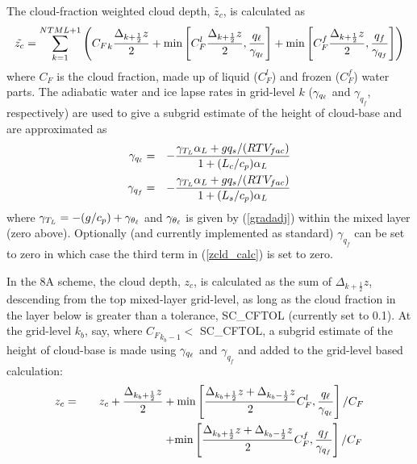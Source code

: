 \documentclass{UMDP_article}
\begin{document}
The cloud-fraction weighted cloud depth, $\tilde{z_c}$, is calculated
as
\begin{equation}
  \tilde{z_c} = \sum_{k=1}^{NTML+1} \left( {C_F}_k \frac{\Delta_{k+\frac{1}{2}} z}{2} 
    + \mbox{min}\left[C_F^l\frac{\Delta_{k+\frac{1}{2}} z}{2}, \frac{q_{\ell}}{\gamma_{q_{\ell}}} \right]
    + \mbox{min}\left[C_F^f\frac{\Delta_{k+\frac{1}{2}} z}{2}, \frac{q_f}{\gamma_{q_f}} \right]
  \right)
\label{zcld_calc}
\end{equation}
where $C_F$ is the cloud fraction, made up of liquid ($C_F^l$) and
frozen ($C_F^f$) water parts.  The adiabatic water and ice lapse rates
in grid-level $k$ ($\gamma_{q_{\ell}}$ and $\gamma_{q_f}$, respectively)
are used to give a subgrid estimate of the height of cloud-base and
are approximated as
\begin{eqnarray*}
  \gamma_{q_{\ell}} &=& -\frac{\gamma_{T_L} \alpha_L + g q_s/(RTV_{fac})}
  {1+(L_c/c_p)\alpha_L} \\
  \gamma_{q_f} &=& -\frac{\gamma_{T_L}\alpha_L + g q_s/(RTV_{fac})}
  {1+(L_s/c_p)\alpha_L}
\end{eqnarray*}
where $\gamma_{T_L} = -(g/c_p)+ \gamma_{\theta_{\ell}}$ and
$\gamma_{\theta_{\ell}}$ is given by (\ref{gradadj}) within the mixed layer
(zero above).  Optionally (and currently implemented as standard)
$\gamma_{q_f}$ can be set to zero in which case the third term in
(\ref{zcld_calc}) is set to zero.

In the 8A scheme, the cloud depth, $z_c$, is calculated as the sum of
$\Delta_{k+\frac{1}{2}} z$, descending from the top mixed-layer
grid-level, as long as the cloud fraction in the layer below is
greater than a tolerance, SC\_CFTOL (currently set to 0.1).  At the
grid-level $k_b$, say, where ${C_F}_{k_b-1} < $ SC\_CFTOL, a subgrid
estimate of the height of cloud-base is made using $\gamma_{q_{\ell}}$ and
$\gamma_{q_f}$ and added to the grid-level based calculation:
\begin{eqnarray}
  z_c &=& z_c + \frac{\Delta_{k_b+\frac{1}{2}} z}{2} 
  + \mbox{min}\left[ \frac{ \Delta_{k_b+\frac{1}{2}}z
      +\Delta_{k_b-\frac{1}{2}}z }{2} C_F^l,
    \frac{ q_{\ell} }{ \gamma_{q_{\ell}} }  \right]/C_F \nonumber \\
  & & \left. \hspace{2.4cm} 
    + \mbox{min}\left[ \frac{ \Delta_{k_b+\frac{1}{2}}z
        +\Delta_{k_b-\frac{1}{2}}z }{2} C_F^f,
      \frac{ q_f }{ \gamma_{q_f} }  \right]/C_F \right.
  \label{zc_calc}
\end{eqnarray}
\end{document}
